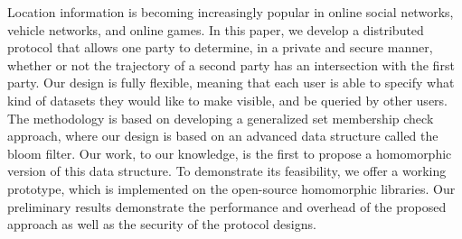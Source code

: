 Location information is becoming increasingly popular in online social networks, vehicle networks, and online games. In this paper, we develop a distributed protocol that allows one party to determine, in a private and secure manner, whether or not the trajectory of a second party has an intersection with the first party. Our design is fully flexible, meaning that each user is able to specify what kind of datasets they would like to make visible, and be queried by other users. The methodology is based on developing a generalized set membership check approach, where our design is based on an advanced data structure called the bloom filter. Our work, to our knowledge, is the first to propose a homomorphic version of this data structure.  To demonstrate its feasibility, we offer a working prototype, which is implemented on the open-source homomorphic libraries. Our preliminary results demonstrate the performance and overhead of the proposed approach as well as the security of the protocol designs.